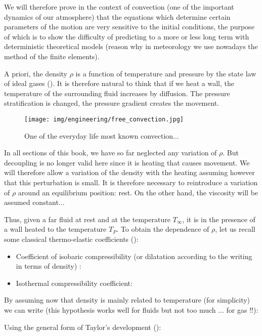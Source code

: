 	We will therefore prove in the context of convection (one of the important dynamics of our atmosphere) that the equations which determine certain parameters of the motion are very sensitive to the initial conditions, the purpose of which is to show the difficulty of predicting to a more or less long term with deterministic theoretical models (reason why in meteorology we use nowadays the method of the finite elements).

	A priori, the density $\rho$ is a function of temperature and pressure by the state law of ideal gases (). It is therefore natural to think that if we heat a wall, the temperature of the surrounding fluid increases by diffusion. The pressure stratification is changed, the pressure gradient creates the movement.
	\begin{figure}[H]
		\centering
		\texttt{[image: img/engineering/free\_convection.jpg]}
		\caption{One of the everyday life most known convection...}
	\end{figure}
	In all sections of this book, we have so far neglected any variation of $\rho$. But decoupling is no longer valid here since it is heating that causes movement. We will therefore allow a variation of the density with the heating assuming however that this perturbation is small. It is therefore necessary to reintroduce a variation of $\rho$ around an equilibrium position: rest. On the other hand, the viscosity will be assumed constant...

	Thus, given a far fluid at rest and at the temperature $T_{\infty}$, it is in the presence of a wall heated to the temperature $T_P$. To obtain the dependence of $\rho$, let us recall some classical thermo-elastic coefficients ():
	\begin{itemize}
		\item Coefficient of isobaric compressibility (or dilatation according to the writing in terms of density) :
		

		\item Isothermal compressibility coefficient:
		
	\end{itemize}
	By assuming now that density is mainly related to temperature (for simplicity) we can write (this hypothesis works well for fluids but not too much ... for gas !!):
	
	Using the general form of Taylor's development ():
	

